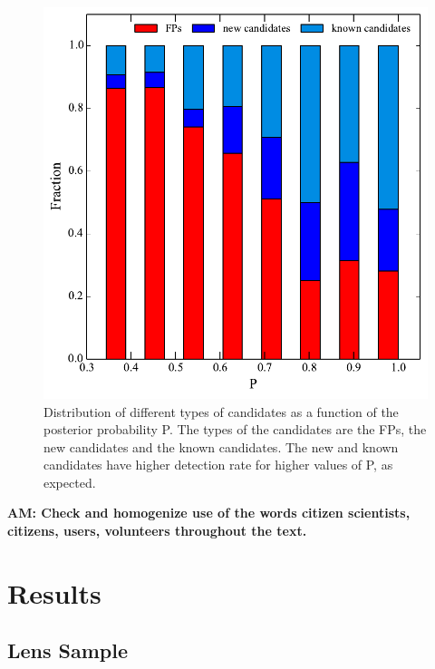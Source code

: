 \documentclass[useAMS,usenatbib,a4paper]{mn2e}
\begin{document}
\begin{figure}
\begin{center}
\includegraphics[scale=0.6]{sw-cfhtls-figs/cand_fp_P_frac.pdf}
\caption{ \label{fig:stackP}
Distribution of different types of candidates as a function of the posterior
probability P. The types of the candidates are the FPs, the new candidates and
the known candidates. The new and known candidates have higher detection rate
for higher values of P, as expected.}
\end{center}
\end{figure}

{\bf AM: Check and homogenize use of the words citizen scientists, citizens, users,
volunteers throughout the text.}

\section{Results}
\label{sec:results}

\subsection{\sw Lens Sample}
\end{document}
